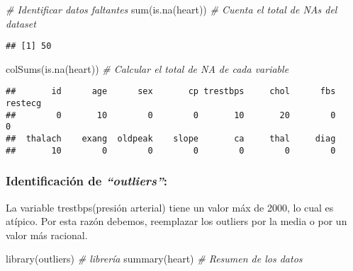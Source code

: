 \documentclass[
]{article}
\newenvironment{Shaded}{\begin{snugshade}}{\end{snugshade}}
\newcommand{\CommentTok}[1]{\textcolor[rgb]{0.56,0.35,0.01}{\textit{#1}}}
\newcommand{\FunctionTok}[1]{\textcolor[rgb]{0.00,0.00,0.00}{#1}}
\newcommand{\NormalTok}[1]{#1}
\begin{document}
\begin{Shaded}
\begin{Highlighting}[]
\CommentTok{\# Identificar datos faltantes}
\FunctionTok{sum}\NormalTok{(}\FunctionTok{is.na}\NormalTok{(heart))      }\CommentTok{\# Cuenta el total de NAs del dataset}
\end{Highlighting}
\end{Shaded}

\begin{verbatim}
## [1] 50
\end{verbatim}

\begin{Shaded}
\begin{Highlighting}[]
\FunctionTok{colSums}\NormalTok{(}\FunctionTok{is.na}\NormalTok{(heart))  }\CommentTok{\# Calcular el total de NA de cada variable }
\end{Highlighting}
\end{Shaded}

\begin{verbatim}
##       id      age      sex       cp trestbps     chol      fbs  restecg 
##        0       10        0        0       10       20        0        0 
##  thalach    exang  oldpeak    slope       ca     thal     diag 
##       10        0        0        0        0        0        0
\end{verbatim}

\hypertarget{identificaciuxf3n-de-outliers}{%
\subsubsection{\texorpdfstring{Identificación de
\emph{``outliers''}:}{Identificación de ``outliers'':}}\label{identificaciuxf3n-de-outliers}}

La variable trestbps(presión arterial) tiene un valor máx de 2000, lo
cual es atípico. Por esta razón debemos, reemplazar los outliers por la
media o por un valor más racional.

\begin{Shaded}
\begin{Highlighting}[]
\FunctionTok{library}\NormalTok{(outliers)        }\CommentTok{\# librería }
\FunctionTok{summary}\NormalTok{(heart)           }\CommentTok{\# Resumen de los datos}
\end{Highlighting}
\end{Shaded}
\end{document}
